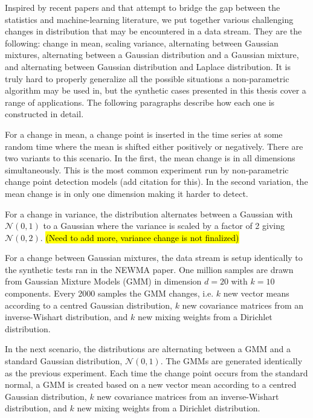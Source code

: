 Inspired by recent papers \cite{chang2019kernel} and \cite{flynn2019change} that attempt to bridge the gap between the statistics and machine-learning literature, we put together various challenging changes in distribution that may be encountered in a data stream. They are the following: change in mean, scaling variance, alternating between Gaussian mixtures, alternating between a Gaussian distribution and a Gaussian mixture, and alternating between Gaussian distribution and Laplace distribution. It is truly hard to properly generalize all the possible situations a non-parametric algorithm may be used in, but the synthetic cases presented in this thesis cover a range of applications. The following paragraphs describe how each one is constructed in detail.

For a change in mean, a change point is inserted in the time series at some random time where the mean is shifted either positively or negatively. There are two variants to this scenario. In the first, the mean change is in all dimensions simultaneously. This is the most common experiment run by non-parametric change point detection models (add citation for this). In the second variation, the mean change is in only one dimension making it harder to detect. 

For a change in variance, the distribution alternates between a Gaussian with $\mathcal{N}(0,1)$ to a Gaussian where the variance is scaled by a factor of 2 giving $\mathcal{N}(0,2)$. \hl{(Need to add more, variance change is not finalized)}

For a change between Gaussian mixtures, the data stream is setup identically to the synthetic tests ran in the NEWMA paper. One million samples are drawn from Gaussian Mixture Models (GMM) in dimension $d = 20$
with $k = 10$ components. Every 2000 samples the GMM changes, i.e. $k$
new vector means according to a centred Gaussian distribution, $k$ new covariance matrices from an
inverse-Wishart distribution, and $k$ new mixing weights from a Dirichlet distribution. 

In the next scenario, the distributions are alternating between a GMM and a standard Gaussian distribution, $\mathcal{N}(0,1)$. The GMMs are generated identically as the previous experiment. Each time the change point occurs from the standard normal, a GMM is created based on a new vector mean according to a centred Gaussian distribution, $k$ new covariance matrices from an
inverse-Wishart distribution, and $k$ new mixing weights from a Dirichlet distribution. 

